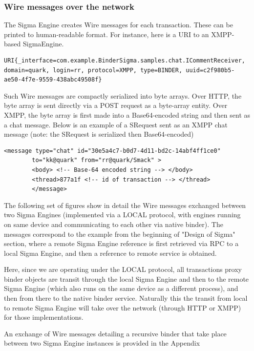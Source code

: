 \documentclass[prodmode]{acmlarge}
\begin{document}
\subsubsection{Wire messages over the network}
The Sigma Engine creates Wire messages for each transaction. These can be printed to human-readable format. For instance, here is a URI to an XMPP-based SigmaEngine.

\begin{Verbatim}[samepage=true]
URI{_interface=com.example.BinderSigma.samples.chat.ICommentReceiver, domain=quark, login=rr, protocol=XMPP, type=BINDER, uuid=c2f980b5-ae50-4f7e-9559-438abc49508f}
\end{Verbatim}

Such Wire messages are compactly serialized into byte arrays. Over HTTP, the byte array is sent directly via a POST request as a byte-array entity. Over XMPP, the byte array is first made into a Base64-encoded string and then sent as a chat message. Below is an example of a SRequest sent as an XMPP chat message (note: the SRequest is serialized then Base64-encoded)

\begin{Verbatim}[samepage=true]
<message type="chat" id="30e5a4c7-b0d7-4d11-bd2c-14abf4ff1ce0"
        to="kk@quark" from="rr@quark/Smack" >
        <body> <!-- Base-64 encoded string --> </body>
        <thread>877a1f <!-- id of transaction --> </thread>
        </message>
\end{Verbatim}

The following set of figures show in detail the Wire messages exchanged between two Sigma Engines (implemented via a LOCAL protocol, with engines running on same device and communicating to each other via native binder). The messages correspond to the example from the beginning of "Design of Sigma" section, where a remote Sigma Engine reference is first retrieved via RPC to a local Sigma Engine, and then a reference to remote service is obtained.

Here, since we are operating under the LOCAL protocol, all transactions proxy binder objects are transit through the local Sigma Engine and then to the remote Sigma Engine (which also runs on the same device as a different process), and then from there to the native binder service. Naturally this the transit from local to remote Sigma Engine will take over the network (through HTTP or XMPP) for those implementations.

An exchange of Wire messages detailing a recursive binder that take place between two Sigma Engine instances is provided in the Appendix
\end{document}
